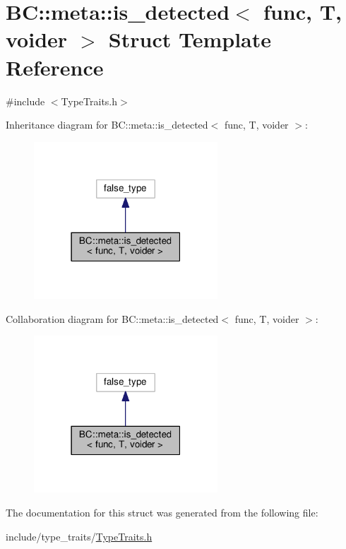\hypertarget{structBC_1_1meta_1_1is__detected}{}\section{BC\+:\+:meta\+:\+:is\+\_\+detected$<$ func, T, voider $>$ Struct Template Reference}
\label{structBC_1_1meta_1_1is__detected}


{\ttfamily \#include $<$Type\+Traits.\+h$>$}



Inheritance diagram for BC\+:\+:meta\+:\+:is\+\_\+detected$<$ func, T, voider $>$\+:
\nopagebreak
\begin{figure}[H]
\begin{center}
\leavevmode
\includegraphics[width=195pt]{structBC_1_1meta_1_1is__detected__inherit__graph}
\end{center}
\end{figure}


Collaboration diagram for BC\+:\+:meta\+:\+:is\+\_\+detected$<$ func, T, voider $>$\+:
\nopagebreak
\begin{figure}[H]
\begin{center}
\leavevmode
\includegraphics[width=195pt]{structBC_1_1meta_1_1is__detected__coll__graph}
\end{center}
\end{figure}


The documentation for this struct was generated from the following file\+:\begin{DoxyCompactItemize}
\item 
include/type\+\_\+traits/\hyperlink{TypeTraits_8h}{Type\+Traits.\+h}\end{DoxyCompactItemize}
